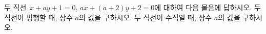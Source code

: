 두 직선~$x+ay+1=0$, $ax+(a+2)y+2=0$에 대하여 다음 물음에 답하시오.
 두 직선이 평행할 때, 상수 $a$의 값을 구하시오.
 두 직선이 수직일 때, 상수 $a$의 값을 구하시오. 
